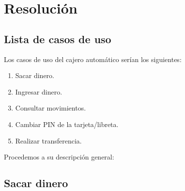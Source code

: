 \documentclass[12pt,spanish]{article}
\begin{document}
\section{Resolución}
\subsection{Lista de casos de uso}

Los casos de uso del cajero automático serían los siguientes:
\begin{enumerate}[label=\textbf{CU-\arabic*}]
\item Sacar dinero.
\item Ingresar dinero.
\item Consultar movimientos.
\item Cambiar PIN de la tarjeta/libreta.
\item Realizar transferencia.
\end{enumerate}
Procedemos a su descripción general:

\subsection{Sacar dinero}
\end{document}
